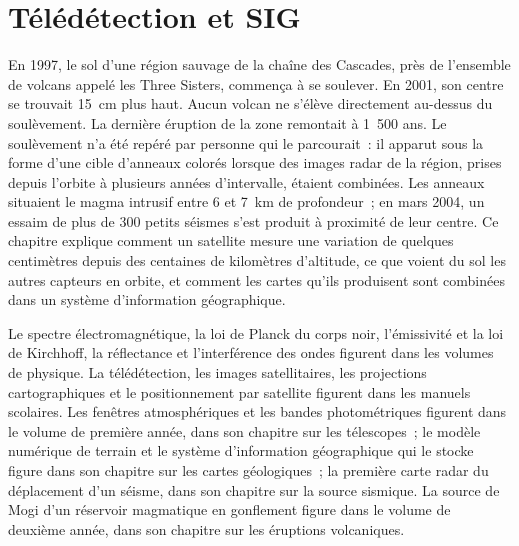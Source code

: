 \chapter{Télédétection et SIG}\label{ch:b3:remote-sensing-gis}

En 1997, le sol d'une région sauvage de la chaîne des Cascades, près de
l'ensemble de volcans appelé les Three Sisters, commença à se soulever. En 2001,
son centre se trouvait \qty{15}{cm} plus haut. Aucun volcan ne s'élève directement
au-dessus du soulèvement. La dernière éruption de la zone remontait à 1~500 ans.
Le soulèvement n'a été repéré par personne qui le parcourait~: il apparut sous la forme
d'une cible d'anneaux colorés lorsque des images radar de la région, prises depuis l'orbite
à plusieurs années d'intervalle, étaient combinées. Les anneaux situaient le magma intrusif
entre 6 et \qty{7}{km} de profondeur~; en mars 2004, un essaim de plus de 300 petits séismes
s'est produit à proximité de leur centre. Ce chapitre explique comment un satellite mesure
une variation de quelques centimètres depuis des centaines de kilomètres d'altitude, ce que voient
du sol les autres capteurs en orbite, et comment les cartes qu'ils produisent sont combinées
dans un système d'information géographique.

\begin{recall}
Le spectre électromagnétique, la loi de Planck du corps noir, l'émissivité
et la loi de Kirchhoff, la réflectance et l'interférence des ondes figurent dans les
volumes de physique. La télédétection, les images satellitaires, les projections
cartographiques et le positionnement par satellite figurent dans les manuels scolaires. Les
fenêtres atmosphériques et les bandes photométriques figurent dans le volume de première année,
dans son chapitre sur les télescopes~; le modèle numérique de terrain et le système
d'information géographique qui le stocke figure dans son chapitre sur les cartes géologiques~;
la première carte radar du déplacement d'un séisme, dans son chapitre sur la source sismique.
La source de Mogi d'un réservoir magmatique en gonflement figure dans le volume de deuxième
année, dans son chapitre sur les éruptions volcaniques.
\end{recall}


